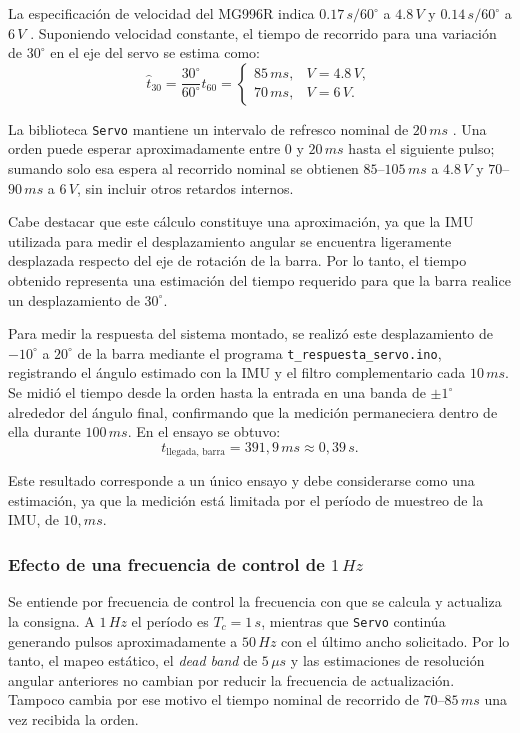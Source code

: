 \documentclass[a4paper, twoside, 10pt, spanish]{article}
\numberwithin{table}{section}
\begin{document}
La especificación de velocidad del MG996R indica $0.17\,s/60^\circ$ a
$4.8\,V$ y $0.14\,s/60^\circ$ a $6\,V$ \cite{mg996r_velocidad}.
Suponiendo velocidad constante, el tiempo de recorrido para una variación
de $30^\circ$ en el eje del servo se estima como:
\begin{equation}
\hat t_{30}=\frac{30^\circ}{60^\circ}t_{60}=
\begin{cases}
85\,ms, & V=4.8\,V,\\
70\,ms, & V=6\,V.
\end{cases}
\end{equation}

La biblioteca \texttt{Servo} mantiene un intervalo de refresco nominal de
$20\,ms$ \cite{arduino_servo}. Una orden puede esperar aproximadamente
entre $0$ y $20\,ms$ hasta el siguiente pulso; sumando solo esa espera al
recorrido nominal se obtienen $85$--$105\,ms$ a $4.8\,V$ y
$70$--$90\,ms$ a $6\,V$, sin incluir otros retardos internos.

Cabe destacar que este cálculo constituye una aproximación, ya que la IMU utilizada para medir el desplazamiento angular se encuentra ligeramente desplazada respecto del eje de rotación de la barra. Por lo tanto, el tiempo obtenido representa una estimación del tiempo requerido para que la barra realice un desplazamiento de $30^\circ$.

Para medir la respuesta del sistema montado, se realizó este desplazamiento
de $-10^\circ$ a $20^\circ$ de la barra mediante el programa
\texttt{t\_respuesta\_servo.ino}, registrando el ángulo estimado con la IMU
y el filtro complementario cada $10\,ms$. Se midió el tiempo desde la orden
hasta la entrada en una banda de $\pm1^\circ$ alrededor del ángulo final,
confirmando que la medición permaneciera dentro de ella durante $100\,ms$.
En el ensayo se obtuvo:
\begin{equation*}
t_{\text{llegada, barra}} = 391{,}9\,ms \approx 0{,}39\,s.
\end{equation*}

Este resultado corresponde a un único ensayo y debe considerarse como una estimación, ya que la medición está limitada por el período de muestreo de la IMU, de $10,ms$.

\subsubsection{Efecto de una frecuencia de control de $1\,Hz$}

Se entiende por frecuencia de control la frecuencia con que se calcula y
actualiza la consigna. A $1\,Hz$ el período es $T_c=1\,s$, mientras que
\texttt{Servo} continúa generando pulsos aproximadamente a $50\,Hz$ con
el último ancho solicitado. Por lo tanto, el mapeo estático, el
\textit{dead band} de $5\,\mu s$ y las estimaciones de resolución angular
anteriores no cambian por reducir la frecuencia de actualización.
Tampoco cambia por ese motivo el tiempo nominal de recorrido de
$70$--$85\,ms$ una vez recibida la orden.
\end{document}
